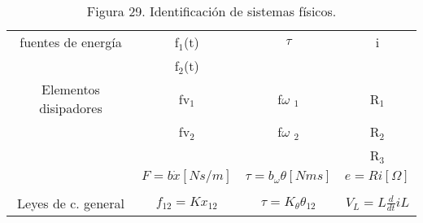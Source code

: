 \begin{table}[t]
\begin{center}
\begin{tabular}{| c | c | c | c | }
fuentes de energía & f$_{1}$(t) & $\tau$ & i \\ 
& f$_{2}$(t) &  &  \\ \hline

Elementos disipadores & fv$_{1}$ & f$\omega$ $_{1}$ & R$_{1}$ \\
& fv$_{2}$ & f$\omega$ $_{2}$ & R$_{2}$ \\
&  &  & R$_{3}$ \\ 
& $F=b\dot{x}[Ns/m]$ & $\tau=b_{\omega}\theta[Nms]$ & $e=Ri[\Omega]$ \\
&  &  &  \\
Leyes de c. general& $f_{12}=Kx_{12}$ & $\tau=K_{\theta}\theta_{12}$ & $V_{L}=L\frac{d}{dt}iL$ \\ \hline


\end{tabular}
\caption{Figura 29. Identificación de sistemas físicos.}
\end{center}
\end{table}